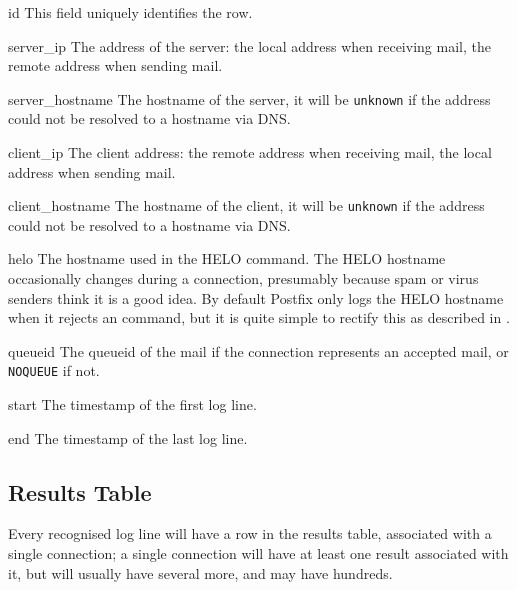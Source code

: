 \begin{boldeqlist}

    \item [id] This field uniquely identifies the row.

    \item [server\_ip] The  address of the server: the local
        address when receiving mail, the remote address when sending mail.

    \item [server\_hostname] The hostname of the server, it will be
        \texttt{unknown} if the  address could not be resolved
        to a hostname via DNS\@.

    \item [client\_ip] The client  address: the remote address
        when receiving mail, the local address when sending mail.

    \item [client\_hostname] The hostname of the client, it will be
        \texttt{unknown} if the  address could not be resolved
        to a hostname via DNS\@.

    \item [helo] The hostname used in the HELO command.  The HELO hostname
        occasionally changes during a connection, presumably because spam
        or virus senders think it is a good idea.  By default Postfix only
        logs the HELO hostname when it rejects an  command,
        but it is quite simple to rectify this as described in
        .

    \item [queueid] The queueid of the mail if the connection represents an
        accepted mail, or \texttt{NOQUEUE} if not.

    \item [start] The timestamp of the first log line.

    \item [end] The timestamp of the last log line.

\end{boldeqlist}

\subsection{Results Table}

\label{results table}

Every recognised log line will have a row in the results table, associated
with a single connection; a single connection will have at least one result
associated with it, but will usually have several more, and may have
hundreds.


